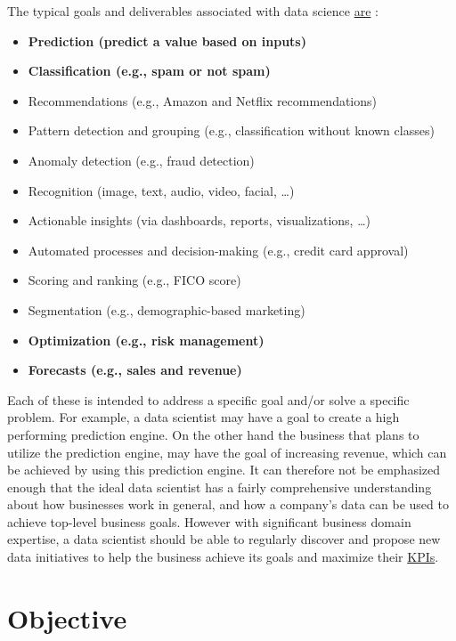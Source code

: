 \documentclass[11pt,fleqn]{book} %
\begin{document}
The typical goals and deliverables associated with data science \href{https://www.innoarchitech.com/what-is-data-science-does-data-scientist-do/}{are} :


\begin{itemize}
\item \textbf{Prediction (predict a value based on inputs)}
\item \textbf{Classification (e.g., spam or not spam)}
\item Recommendations (e.g., Amazon and Netflix recommendations)
\item Pattern detection and grouping (e.g., classification without known classes)
\item Anomaly detection (e.g., fraud detection)
\item Recognition (image, text, audio, video, facial, …)
\item Actionable insights (via dashboards, reports, visualizations, …)
\item Automated processes and decision-making (e.g., credit card approval)
\item Scoring and ranking (e.g., FICO score)
\item Segmentation (e.g., demographic-based marketing)
\item \textbf{Optimization (e.g., risk management)}
\item \textbf{Forecasts (e.g., sales and revenue)}
\end{itemize}


Each of these is intended to address a specific goal and/or solve a specific problem. For example, a data scientist may have a goal to create a high performing prediction engine. On the other hand the business that plans to utilize the prediction engine, may have the goal of increasing revenue, which can be achieved by using this prediction engine. It can therefore not be emphasized enough that the ideal data scientist has a fairly comprehensive understanding about how businesses work in general, and how a company’s data can be used to achieve top-level business goals. However with significant business domain expertise, a data scientist should be able to regularly discover and propose new data initiatives to help the business achieve its goals and maximize their \href{https://www.innoarchitech.com/what-is-data-science-does-data-scientist-do/}{KPIs}.

\clearpage
\section{Objective}
\end{document}

